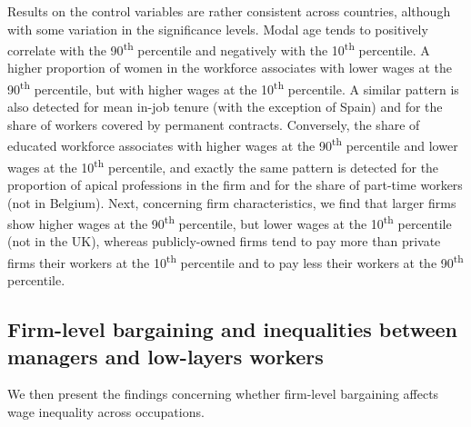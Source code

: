 \documentclass[12pt]{article}
\begin{document}
% 

Results on the control variables are rather consistent across
countries, although with some variation in the significance levels.
Modal age tends to positively correlate with the
90\textsuperscript{th} percentile and negatively with the
10\textsuperscript{th} percentile.  A higher proportion of women in
the workforce associates with lower wages at the
90\textsuperscript{th} percentile, but with higher wages at the
10\textsuperscript{th} percentile. A similar pattern is also detected
for mean in-job tenure (with the exception of Spain) and for the share
of workers covered by permanent contracts. Conversely, the share of
educated workforce associates with higher wages at the
90\textsuperscript{th} percentile and lower wages at the
10\textsuperscript{th} percentile, and exactly the same pattern is
detected for the proportion of apical professions in the firm and for
the share of part-time workers (not in Belgium). Next, concerning firm
characteristics, we find that larger firms show higher wages at the
90\textsuperscript{th} percentile, but lower wages at the
10\textsuperscript{th} percentile (not in the UK), whereas
publicly-owned firms tend to pay more than private firms their workers
at the 10\textsuperscript{th} percentile and to pay less their workers
at the 90\textsuperscript{th} percentile.





\subsection{Firm-level bargaining and inequalities between managers and low-layers workers}

% 

We then present the findings concerning whether firm-level bargaining
affects wage inequality across occupations.
\end{document}
